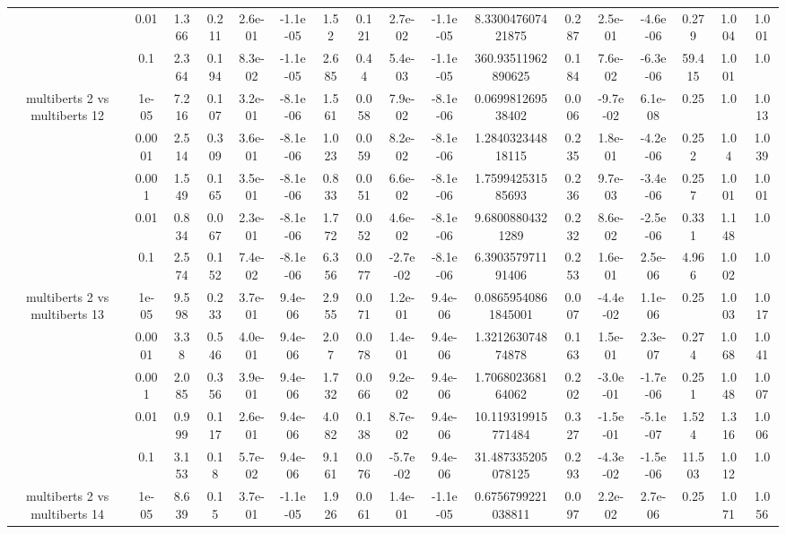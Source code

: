 \begin{tabular}{|c|c|c|c|c|c|c|c|c|c|c|c|c|c|c|c|c|}
 & 0.01 & 1.366 & 0.211 & 2.6e-01 & -1.1e-05 & 1.52 & 0.121 & 2.7e-02 & -1.1e-05 & 8.330047607421875 & 0.287 & 2.5e-01 & -4.6e-06 & 0.279 & 1.004 & 1.001 \\
 & 0.1 & 2.364 & 0.194 & 8.3e-02 & -1.1e-05 & 2.685 & 0.44 & 5.4e-03 & -1.1e-05 & 360.93511962890625 & 0.184 & 7.6e-02 & -6.3e-06 & 59.415 & 1.001 & 1.0 \\
\hline
\multirow{5}{*}{multiberts 2 vs multiberts 12} & 1e-05 & 7.216 & 0.107 & 3.2e-01 & -8.1e-06 & 1.561 & 0.058 & 7.9e-02 & -8.1e-06 & 0.069981269538402 & 0.006 & -9.7e-02 & 6.1e-08 & 0.25 & 1.0 & 1.013 \\
 & 0.0001 & 2.514 & 0.309 & 3.6e-01 & -8.1e-06 & 1.023 & 0.059 & 8.2e-02 & -8.1e-06 & 1.284032344818115 & 0.235 & 1.8e-01 & -4.2e-06 & 0.252 & 1.04 & 1.039 \\
 & 0.001 & 1.549 & 0.165 & 3.5e-01 & -8.1e-06 & 0.833 & 0.051 & 6.6e-02 & -8.1e-06 & 1.759942531585693 & 0.236 & 9.7e-03 & -3.4e-06 & 0.257 & 1.001 & 1.001 \\
 & 0.01 & 0.834 & 0.067 & 2.3e-01 & -8.1e-06 & 1.772 & 0.052 & 4.6e-02 & -8.1e-06 & 9.68008804321289 & 0.232 & 8.6e-02 & -2.5e-06 & 0.331 & 1.148 & 1.0 \\
 & 0.1 & 2.574 & 0.152 & 7.4e-02 & -8.1e-06 & 6.356 & 0.077 & -2.7e-02 & -8.1e-06 & 6.390357971191406 & 0.253 & 1.6e-01 & 2.5e-06 & 4.966 & 1.002 & 1.0 \\
\hline
\multirow{5}{*}{multiberts 2 vs multiberts 13} & 1e-05 & 9.598 & 0.233 & 3.7e-01 & 9.4e-06 & 2.955 & 0.071 & 1.2e-01 & 9.4e-06 & 0.08659540861845001 & 0.007 & -4.4e-02 & 1.1e-06 & 0.25 & 1.003 & 1.017 \\
 & 0.0001 & 3.38 & 0.546 & 4.0e-01 & 9.4e-06 & 2.07 & 0.078 & 1.4e-01 & 9.4e-06 & 1.321263074874878 & 0.163 & 1.5e-01 & 2.3e-07 & 0.274 & 1.068 & 1.041 \\
 & 0.001 & 2.085 & 0.356 & 3.9e-01 & 9.4e-06 & 1.732 & 0.066 & 9.2e-02 & 9.4e-06 & 1.706802368164062 & 0.202 & -3.0e-01 & -1.7e-06 & 0.251 & 1.048 & 1.007 \\
 & 0.01 & 0.999 & 0.117 & 2.6e-01 & 9.4e-06 & 4.082 & 0.138 & 8.7e-02 & 9.4e-06 & 10.119319915771484 & 0.327 & -1.5e-01 & -5.1e-07 & 1.524 & 1.316 & 1.006 \\
 & 0.1 & 3.153 & 0.18 & 5.7e-02 & 9.4e-06 & 9.161 & 0.076 & -5.7e-02 & 9.4e-06 & 31.487335205078125 & 0.293 & -4.3e-02 & -1.5e-06 & 11.503 & 1.012 & 1.0 \\
\hline
\multirow{5}{*}{multiberts 2 vs multiberts 14} & 1e-05 & 8.639 & 0.15 & 3.7e-01 & -1.1e-05 & 1.926 & 0.061 & 1.4e-01 & -1.1e-05 & 0.6756799221038811 & 0.097 & 2.2e-02 & 2.7e-06 & 0.25 & 1.071 & 1.056 \\

\end{tabular}
